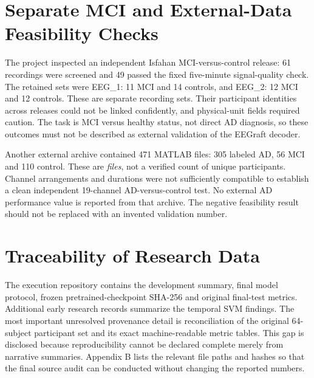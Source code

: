 \section{Separate MCI and External-Data Feasibility Checks}
The project inspected an independent Isfahan MCI-versus-control release: 61 recordings were screened and 49 passed the fixed five-minute signal-quality check. The retained sets were EEG\_1: 11 MCI and 14 controls, and EEG\_2: 12 MCI and 12 controls. These are separate recording sets. Their participant identities across releases could not be linked confidently, and physical-unit fields required caution. The task is MCI versus healthy status, not direct AD diagnosis, so these outcomes must not be described as external validation of the EEGraft decoder.

Another external archive contained 471 MATLAB files: 305 labeled AD, 56 MCI and 110 control. These are \emph{files}, not a verified count of unique participants. Channel arrangements and durations were not sufficiently compatible to establish a clean independent 19-channel AD-versus-control test. No external AD performance value is reported from that archive. The negative feasibility result should not be replaced with an invented validation number.

\section{Traceability of Research Data}
The execution repository contains the development summary, final model protocol, frozen pretrained-checkpoint SHA-256 and original final-test metrics. Additional early research records summarize the temporal SVM findings. The most important unresolved provenance detail is reconciliation of the original 64-subject participant set and its exact machine-readable metric tables. This gap is disclosed because reproducibility cannot be declared complete merely from narrative summaries. Appendix B lists the relevant file paths and hashes so that the final source audit can be conducted without changing the reported numbers.
